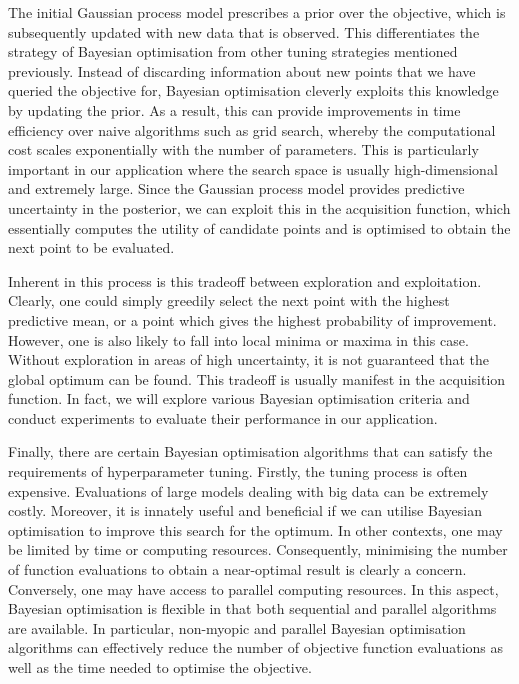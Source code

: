 \documentclass[letterpaper]{article}
\begin{document}
The initial Gaussian process model prescribes a prior over the objective, which is
subsequently updated with new data that is observed. This differentiates the
strategy of Bayesian optimisation from other tuning strategies mentioned previously.
Instead of discarding information about new points that we have queried the
objective for, Bayesian optimisation cleverly exploits this
knowledge by updating the prior. As a result, this can provide improvements in time
efficiency over naive algorithms such as grid search, whereby the computational
cost scales exponentially with the number of parameters. This is particularly
important in our application where the search space is usually high-dimensional
and extremely large. Since the Gaussian process model provides predictive uncertainty
in the posterior, we can exploit this in the acquisition function, which essentially
computes the utility of candidate points and is optimised to obtain the next point
to be evaluated.

Inherent in this process is this tradeoff between exploration and exploitation.
Clearly, one could simply greedily select the next point with the highest predictive
mean, or a point which gives the highest probability of improvement. However, one
is also likely to fall into local minima or maxima in this case. Without exploration
in areas of high uncertainty, it is not guaranteed that the global optimum can be
found. This tradeoff is usually manifest in the acquisition function. In fact,
we will explore various Bayesian optimisation criteria and conduct experiments to
evaluate their performance in our application.

Finally, there are certain Bayesian optimisation algorithms that can satisfy the
requirements of hyperparameter tuning. Firstly, the tuning process is often
expensive. Evaluations of large models dealing with big data can be extremely
costly. Moreover, it is innately useful and beneficial if we can utilise
Bayesian optimisation to improve this search for the optimum. In other contexts,
one may be limited by time or computing resources. Consequently, minimising the
number of function evaluations to obtain a near-optimal result is clearly a concern.
Conversely, one may have access to parallel computing resources. In this aspect,
Bayesian optimisation is flexible in that both sequential and parallel algorithms
are available. In particular, non-myopic and parallel Bayesian optimisation
algorithms can effectively reduce the number of objective function evaluations
as well as the time needed to optimise the objective.
\end{document}
